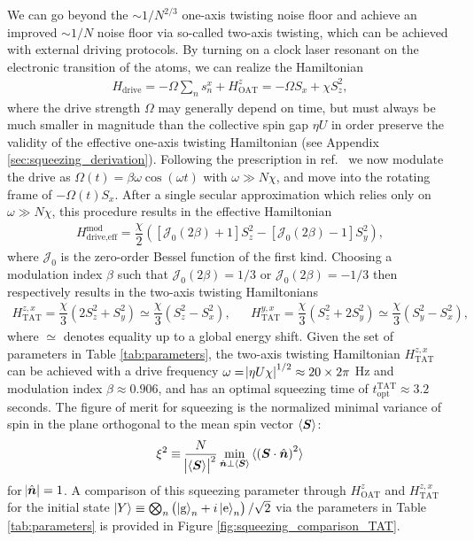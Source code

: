 \documentclass[aps,notitlepage,nofootinbib,11pt]{revtex4-1}
\renewcommand{\t}{\text} %
\newcommand{\f}[2]{\dfrac{#1}{#2}} %
\newcommand{\p}[1]{\left(#1\right)} %
\renewcommand{\sp}[1]{\left[#1\right]} %
\renewcommand{\v}{\bm} %
\renewcommand{\c}{\cdot} %
\newcommand{\bk}{\braket} %
\newcommand{\g}{\text{g}} %
\newcommand{\e}{\text{e}}
\newcommand{\J}{\mathcal{J}}
\newcommand{\1}{\mathds{1}}
\begin{document}
We can go beyond the $\sim1/N^{2/3}$ one-axis twisting noise floor and
achieve an improved $\sim1/N$ noise floor via so-called two-axis
twisting, which can be achieved with external driving protocols.  By
turning on a clock laser resonant on the electronic transition of the
atoms, we can realize the Hamiltonian
\begin{align}
  H_{\t{drive}} = -\Omega \sum_n s_n^x + H_{\t{OAT}}^z
  = -\Omega S_x + \chi S_z^2,
\end{align}
where the drive strength $\Omega$ may generally depend on time, but
must always be much smaller in magnitude than the collective spin gap
$\eta U$ in order preserve the validity of the effective one-axis
twisting Hamiltonian (see Appendix \ref{sec:squeezing_derivation}).
Following the prescription in ref.~\cite{huang2015twoaxis} we now
modulate the drive as $\Omega\p{t}=\beta\omega\cos\p{\omega t}$ with
$\omega\gg N\chi$, and move into the rotating frame of
$-\Omega\p{t}S_x$.  After a single secular approximation which relies
only on $\omega\gg N\chi$, this procedure results in the effective
Hamiltonian
\begin{align}
  H_{\t{drive,eff}}^{\t{mod}}
  = \f{\chi}{2} \p{\sp{\J_0\p{2\beta}+1} S_z^2
    - \sp{\J_0\p{2\beta}-1} S_y^2},
\end{align}
where $\J_0$ is the zero-order Bessel function of the first kind.
Choosing a modulation index $\beta$ such that $\J_0\p{2\beta}=1/3$ or
$\J_0\p{2\beta}=-1/3$ then respectively results in the two-axis
twisting Hamiltonians
\begin{align}
  H_{\t{TAT}}^{z,x}
  = \f{\chi}{3} \p{2 S_z^2 + S_y^2}
  \simeq \f{\chi}{3} \p{S_z^2 - S_x^2},
  &&
  H_{\t{TAT}}^{y,x}
  = \f{\chi}{3} \p{S_z^2 + 2 S_y^2}
  \simeq \f{\chi}{3}\p{S_y^2 - S_x^2},
  \label{eq:H_TAT_drive}
\end{align}
where $\simeq$ denotes equality up to a global energy shift.  Given
the set of parameters in Table \ref{tab:parameters}, the two-axis
twisting Hamiltonian $H_{\t{TAT}}^{z,x}$ can be achieved with a drive
frequency $\omega=\abs{\eta U\chi}^{1/2}\approx20\times2\pi$ Hz and
modulation index $\beta\approx0.906$, and has an optimal squeezing
time of $t_{\t{opt}}^{\t{TAT}}\approx3.2$ seconds.  The figure of
merit for squeezing is the normalized minimal variance of spin in the
plane orthogonal to the mean spin vector $\bk{\v S}$:
\begin{align}
  \xi^2 \equiv \f{N}{\abs{\bk{\v S}}^2}
  \min_{\hat{\v n}\perp\bk{\v S}} \bk{\p{\v S\c\hat{\v n}}^2}
\end{align}
for $\abs{\hat{\v n}}=1$.  A comparison of this squeezing parameter
through $H_{\t{OAT}}^z$ and $H_{\t{TAT}}^{z,x}$ for the initial state
$\ket{Y}\equiv\bigotimes_n\p{\ket{\g}_n+i\ket{\e}_n}/\sqrt2$ via the
parameters in Table \ref{tab:parameters} is provided in Figure
\ref{fig:squeezing_comparison_TAT}.
\end{document}
